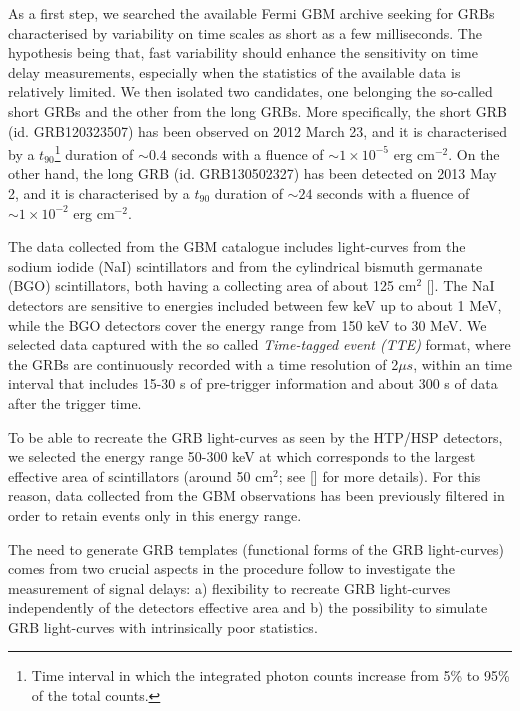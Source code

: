 \documentclass[]{spie}  %
\def \us{$\mu s$\xspace}
\begin{document}
As a first step, we searched the available Fermi GBM archive seeking for GRBs characterised by variability on time scales as short as a few milliseconds. The hypothesis being that, fast variability should enhance the sensitivity on time delay measurements, especially when the statistics of the available data is relatively limited. We then isolated two candidates, one belonging the so-called short GRBs and the other from the long GRBs. More specifically, the short GRB (id. GRB120323507) has been observed on 2012 March 23, and it is characterised by a $t_{90}$\footnote{Time interval in which the integrated photon counts increase from 5\% to 95\% of the total counts.} duration of $\sim0.4$ seconds with a fluence of $\sim1\times10^{-5}$ erg cm$^{-2}$. On the other hand, the long GRB (id. GRB130502327) has been detected on 2013 May 2, and it is characterised by a $t_{90}$ duration of $\sim24$ seconds with a fluence of $\sim1\times10^{-2}$ erg cm$^{-2}$.

The data collected from the GBM catalogue includes light-curves from the sodium iodide (NaI) scintillators and from the cylindrical bismuth germanate (BGO) scintillators, both having a collecting area of about 125 cm$^2$ []. The NaI detectors are sensitive to energies included between few keV up to about 1 MeV, while the BGO detectors cover the energy range from 150 keV to 30 MeV. We selected data captured with the so called \textit{Time-tagged event (TTE)} format, where the GRBs are continuously recorded with a time resolution of 2\us, within an time interval that includes 15-30 s of pre-trigger information and about 300 s of data after the trigger time.

To be able to recreate the GRB light-curves as seen by the HTP/HSP detectors, we selected the energy range 50-300 keV at which corresponds to the largest effective area of scintillators (around 50 cm$^2$; see [] for more details). For this reason, data collected from the GBM observations has been previously filtered in order to retain events only in this energy range.

The need to generate GRB templates (functional forms of the GRB light-curves) comes from two crucial aspects in the procedure follow to investigate the measurement of signal delays: a) flexibility to recreate GRB light-curves independently of the detectors effective area and b) the possibility to simulate GRB light-curves with intrinsically poor statistics.  
\end{document}
